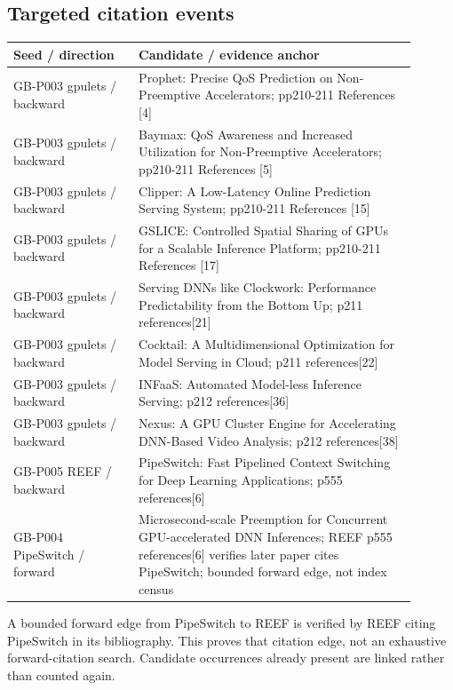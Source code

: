 \documentclass[12pt,a4paper]{article}
\begin{document}
\subsection{Targeted citation events}
\begin{longtable}{p{0.28\linewidth}p{0.62\linewidth}}
\toprule
Seed /\allowbreak{} direction & Candidate /\allowbreak{} evidence anchor\\\midrule
\endhead
GB-P003 gpulets /\allowbreak{} backward & Prophet: Precise QoS Prediction on Non-Preemptive Accelerators; pp210-211 References [4]\\
GB-P003 gpulets /\allowbreak{} backward & Baymax: QoS Awareness and Increased Utilization for Non-Preemptive Accelerators; pp210-211 References [5]\\
GB-P003 gpulets /\allowbreak{} backward & Clipper: A Low-Latency Online Prediction Serving System; pp210-211 References [15]\\
GB-P003 gpulets /\allowbreak{} backward & GSLICE: Controlled Spatial Sharing of GPUs for a Scalable Inference Platform; pp210-211 References [17]\\
GB-P003 gpulets /\allowbreak{} backward & Serving DNNs like Clockwork: Performance Predictability from the Bottom Up; p211 references[21]\\
GB-P003 gpulets /\allowbreak{} backward & Cocktail: A Multidimensional Optimization for Model Serving in Cloud; p211 references[22]\\
GB-P003 gpulets /\allowbreak{} backward & INFaaS: Automated Model-less Inference Serving; p212 references[36]\\
GB-P003 gpulets /\allowbreak{} backward & Nexus: A GPU Cluster Engine for Accelerating DNN-Based Video Analysis; p212 references[38]\\
GB-P005 REEF /\allowbreak{} backward & PipeSwitch: Fast Pipelined Context Switching for Deep Learning Applications; p555 references[6]\\
GB-P004 PipeSwitch /\allowbreak{} forward & Microsecond-scale Preemption for Concurrent GPU-accelerated DNN Inferences; REEF p555 references[6] verifies later paper cites PipeSwitch; bounded forward edge, not index census\\
\bottomrule
\end{longtable}

A bounded forward edge from PipeSwitch to REEF is verified by REEF citing PipeSwitch in its bibliography. This proves that citation edge, not an exhaustive forward-citation search. Candidate occurrences already present are linked rather than counted again.
\end{document}
